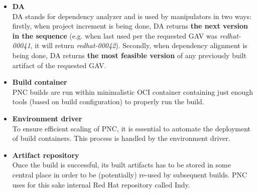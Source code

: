 \documentclass[../main.tex]{subfiles}
\begin{document}
\begin{itemize}
    \item \textbf{DA}\\
    DA stands for dependency analyzer and is used by manipulators in two ways: firstly, when project increment is being done, DA returns \textbf{the next version in the sequence} (e.g. when last used per the requested GAV was \textit{redhat-00041}, it will return \textit{redhat-00042}). Secondly, when dependency alignment is being done, DA returns \textbf{the most feasible version} of any previously built artifact of the requested GAV.

    \item \textbf{Build container}\\
    PNC builds are run within minimalistic OCI container containing just enough tools (based on build configuration) to properly run the build.

    \item \textbf{Environment driver}\\
    To ensure efficient scaling of PNC, it is essential to automate the deployment of build containers. This process is handled by the environment driver.

    \item \textbf{Artifact repository}\\
    Once the build is successful, its built artifacts has to be stored in some central place in order to be (potentially) re-used by subsequent builds. PNC uses for this sake internal Red Hat repository called Indy.

\end{itemize}
\end{document}
